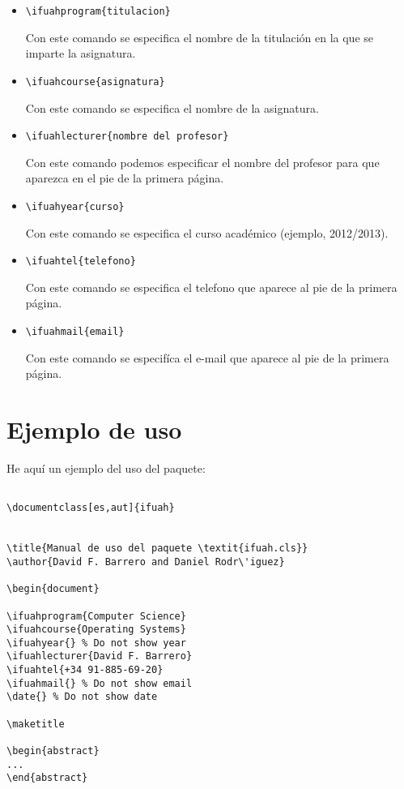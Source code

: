 \documentclass[es,aut]{ifuah}
\begin{document}
\begin{itemize}
\item \begin{verbatim}\ifuahprogram{titulacion}\end{verbatim} Con este comando se especifica el nombre de la titulaci\'on en la que se imparte la asignatura.
\item \begin{verbatim}\ifuahcourse{asignatura}\end{verbatim} Con este comando se especifica el nombre de la asignatura.
\item \begin{verbatim}\ifuahlecturer{nombre del profesor}\end{verbatim} Con este comando podemos especificar el nombre del profesor para que aparezca en el pie de la primera p\'agina.
\item \begin{verbatim}\ifuahyear{curso}\end{verbatim} Con este comando se especifica el curso acad\'emico (ejemplo, 2012/2013).
\item \begin{verbatim}\ifuahtel{telefono}\end{verbatim} Con este comando se especifica el telefono que aparece al pie de la primera p\'agina.
\item \begin{verbatim}\ifuahmail{email}\end{verbatim} Con este comando se especif\'ica el e-mail que aparece al pie de la primera p\'agina.
\end{itemize}

\section{Ejemplo de uso}

He aqu\'i un ejemplo del uso del paquete:

\begin{verbatim}

\documentclass[es,aut]{ifuah}


\title{Manual de uso del paquete \textit{ifuah.cls}}
\author{David F. Barrero and Daniel Rodr\'iguez}

\begin{document}

\ifuahprogram{Computer Science}
\ifuahcourse{Operating Systems}
\ifuahyear{} % Do not show year
\ifuahlecturer{David F. Barrero}
\ifuahtel{+34 91-885-69-20}
\ifuahmail{} % Do not show email
\date{} % Do not show date

\maketitle

\begin{abstract}
...
\end{abstract}

\end{verbatim}
\end{document}
